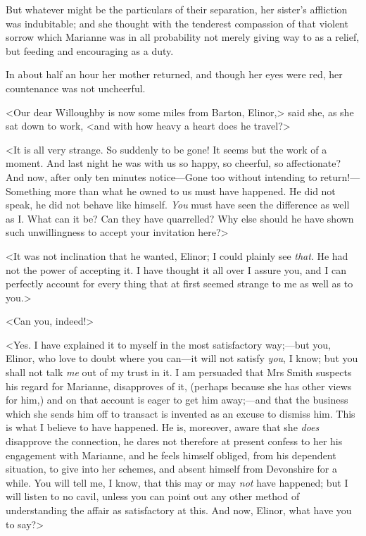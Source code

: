 But whatever might be the particulars of their separation, her sister's affliction was indubitable; and she thought with the tenderest compassion of that violent sorrow which Marianne was in all probability not merely giving way to as a relief, but feeding and encouraging as a duty.

In about half an hour her mother returned, and though her eyes were red, her countenance was not uncheerful.

<Our dear Willoughby is now some miles from Barton, Elinor,> said she, as she sat down to work, <and with how heavy a heart does he travel?>

<It is all very strange. So suddenly to be gone! It seems but the work of a moment. And last night he was with us so happy, so cheerful, so affectionate? And now, after only ten minutes notice—Gone too without intending to return!—Something more than what he owned to us must have happened. He did not speak, he did not behave like himself. \textit{You} must have seen the difference as well as I\@. What can it be? Can they have quarrelled? Why else should he have shown such unwillingness to accept your invitation here?>

<It was not inclination that he wanted, Elinor; I could plainly see \textit{that}. He had not the power of accepting it. I have thought it all over I assure you, and I can perfectly account for every thing that at first seemed strange to me as well as to you.>

<Can you, indeed!>

<Yes. I have explained it to myself in the most satisfactory way;—but you, Elinor, who love to doubt where you can—it will not satisfy \textit{you}, I know; but you shall not talk \textit{me} out of my trust in it. I am persuaded that Mrs Smith suspects his regard for Marianne, disapproves of it, (perhaps because she has other views for him,) and on that account is eager to get him away;—and that the business which she sends him off to transact is invented as an excuse to dismiss him. This is what I believe to have happened. He is, moreover, aware that she \textit{does} disapprove the connection, he dares not therefore at present confess to her his engagement with Marianne, and he feels himself obliged, from his dependent situation, to give into her schemes, and absent himself from Devonshire for a while. You will tell me, I know, that this may or may \textit{not} have happened; but I will listen to no cavil, unless you can point out any other method of understanding the affair as satisfactory at this. And now, Elinor, what have you to say?>

